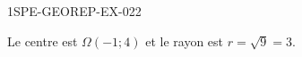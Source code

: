 \begin{corrige}{1SPE-GEOREP-EX-022}


Le centre est $\Omega(-1 ; 4)$ et le rayon est $r = \sqrt{9} = 3$.

\end{corrige}
